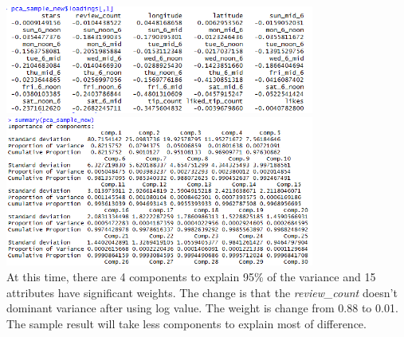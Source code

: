 \documentclass[11pt]{article}
\begin{document}
\begin{enumerate}[(a)]
\begin{enumerate}
\includegraphics[width=4in]{e.png}\\
\includegraphics[width=4in]{f.png}\\
At this time, there are 4 components to explain 95\% of the variance and 15 attributes have significant weights. The change is that the {\em review\_count} doesn't dominant variance after using log value. The weight is change from 0.88 to 0.01. 
\\The sample result will take less components to explain most of difference.  
\end{enumerate} 
\end{enumerate}
\end{document}
